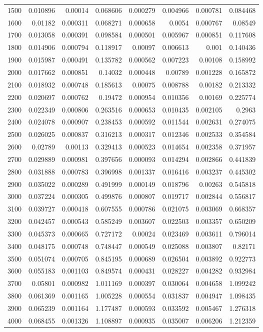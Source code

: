 \begin{tabular}{r r r r r r r r}
1500 & 0.010896 & 0.00014 & 0.068606 & 0.000279 & 0.004966 & 0.000781 & 0.084468 \\
1600 & 0.01182 & 0.000311 & 0.068271 & 0.000658 & 0.0054 & 0.000767 & 0.08549 \\
1700 & 0.013058 & 0.000391 & 0.098584 & 0.000501 & 0.005967 & 0.000851 & 0.117608 \\
1800 & 0.014906 & 0.000794 & 0.118917 & 0.00097 & 0.006613 & 0.001 & 0.140436 \\
1900 & 0.015987 & 0.000491 & 0.135782 & 0.000562 & 0.007223 & 0.00108 & 0.158992 \\
2000 & 0.017662 & 0.000851 & 0.14032 & 0.000448 & 0.00789 & 0.001228 & 0.165872 \\
2100 & 0.018932 & 0.000748 & 0.185613 & 0.00075 & 0.008788 & 0.00182 & 0.213332 \\
2200 & 0.020697 & 0.000762 & 0.19472 & 0.000954 & 0.010356 & 0.00169 & 0.225774 \\
2300 & 0.022349 & 0.000806 & 0.263516 & 0.000653 & 0.010435 & 0.002105 & 0.2963 \\
2400 & 0.024078 & 0.000907 & 0.238453 & 0.000592 & 0.011544 & 0.002631 & 0.274075 \\
2500 & 0.026025 & 0.000837 & 0.316213 & 0.000317 & 0.012346 & 0.002533 & 0.354584 \\
2600 & 0.02789 & 0.00113 & 0.329413 & 0.000523 & 0.014654 & 0.002358 & 0.371957 \\
2700 & 0.029889 & 0.000981 & 0.397656 & 0.000093 & 0.014294 & 0.002866 & 0.441839 \\
2800 & 0.031888 & 0.000783 & 0.396998 & 0.001337 & 0.016416 & 0.003237 & 0.445302 \\
2900 & 0.035022 & 0.000289 & 0.491999 & 0.000149 & 0.018796 & 0.00263 & 0.545818 \\
3000 & 0.037224 & 0.000305 & 0.499876 & 0.000807 & 0.019717 & 0.002844 & 0.556817 \\
3100 & 0.039727 & 0.000418 & 0.607555 & 0.000786 & 0.021075 & 0.003069 & 0.668357 \\
3200 & 0.042457 & 0.000543 & 0.585249 & 0.003607 & 0.022503 & 0.003357 & 0.650209 \\
3300 & 0.045373 & 0.000665 & 0.727172 & 0.00024 & 0.023469 & 0.003611 & 0.796014 \\
3400 & 0.048175 & 0.000748 & 0.748447 & 0.000549 & 0.025088 & 0.003807 & 0.82171 \\
3500 & 0.051074 & 0.000705 & 0.845195 & 0.000689 & 0.026504 & 0.003892 & 0.922773 \\
3600 & 0.055183 & 0.001103 & 0.849574 & 0.000431 & 0.028227 & 0.004282 & 0.932984 \\
3700 & 0.05801 & 0.000982 & 1.011169 & 0.000397 & 0.030064 & 0.004658 & 1.099242 \\
3800 & 0.061369 & 0.001165 & 1.005228 & 0.000554 & 0.031837 & 0.004947 & 1.098435 \\
3900 & 0.065239 & 0.001164 & 1.177487 & 0.000593 & 0.033592 & 0.005467 & 1.276318 \\
4000 & 0.068455 & 0.001326 & 1.108897 & 0.000935 & 0.035007 & 0.006206 & 1.212359 \\
\end{tabular}

